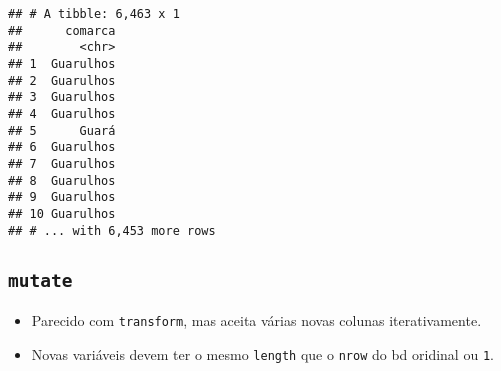 \documentclass[]{book}
\newenvironment{Shaded}{\begin{snugshade}}{\end{snugshade}}
\newcommand{\KeywordTok}[1]{\textcolor[rgb]{0.13,0.29,0.53}{\textbf{{#1}}}}
\newcommand{\DataTypeTok}[1]{\textcolor[rgb]{0.13,0.29,0.53}{{#1}}}
\newcommand{\DecValTok}[1]{\textcolor[rgb]{0.00,0.00,0.81}{{#1}}}
\newcommand{\StringTok}[1]{\textcolor[rgb]{0.31,0.60,0.02}{{#1}}}
\newcommand{\NormalTok}[1]{{#1}}
\providecommand{\tightlist}{%
  \setlength{\itemsep}{0pt}\setlength{\parskip}{0pt}}
\begin{document}
\begin{Shaded}
\end{Shaded}

\begin{verbatim}
## # A tibble: 6,463 x 1
##      comarca
##        <chr>
## 1  Guarulhos
## 2  Guarulhos
## 3  Guarulhos
## 4  Guarulhos
## 5      Guará
## 6  Guarulhos
## 7  Guarulhos
## 8  Guarulhos
## 9  Guarulhos
## 10 Guarulhos
## # ... with 6,453 more rows
\end{verbatim}

\subsection{\texorpdfstring{\texttt{mutate}}{mutate}}\label{mutate}

\begin{itemize}
\tightlist
\item
  Parecido com \texttt{transform}, mas aceita várias novas colunas
  iterativamente.
\item
  Novas variáveis devem ter o mesmo \texttt{length} que o \texttt{nrow}
  do bd oridinal ou \texttt{1}.
\end{itemize}

\begin{Shaded}
\end{Shaded}
\end{document}
